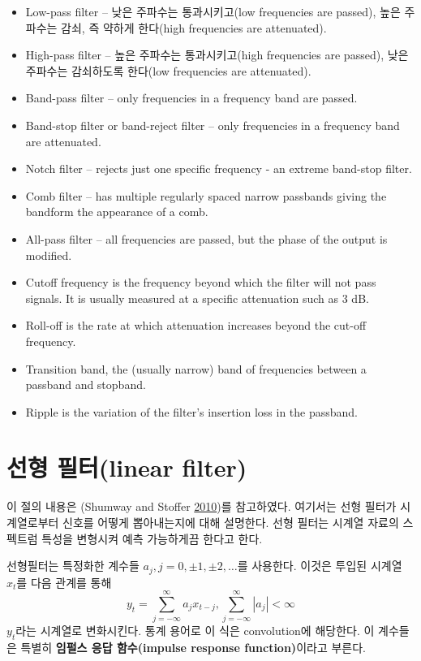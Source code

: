 \documentclass[b5paper,]{book}
\theoremstyle{definition}
\theoremstyle{definition}
\theoremstyle{definition}
\theoremstyle{remark}
\begin{document}
\begin{itemize}
\item
  Low-pass filter -- 낮은 주파수는 통과시키고(low frequencies are
  passed), 높은 주파수는 감쇠, 즉 약하게 한다(high frequencies are
  attenuated).
\item
  High-pass filter -- 높은 주파수는 통과시키고(high frequencies are
  passed), 낮은 주파수는 감쇠하도록 한다(low frequencies are
  attenuated).
\item
  Band-pass filter -- only frequencies in a frequency band are passed.
\item
  Band-stop filter or band-reject filter -- only frequencies in a
  frequency band are attenuated.
\item
  Notch filter -- rejects just one specific frequency - an extreme
  band-stop filter.
\item
  Comb filter -- has multiple regularly spaced narrow passbands giving
  the bandform the appearance of a comb.
\item
  All-pass filter -- all frequencies are passed, but the phase of the
  output is modified.
\item
  Cutoff frequency is the frequency beyond which the filter will not
  pass signals. It is usually measured at a specific attenuation such as
  3 dB.
\item
  Roll-off is the rate at which attenuation increases beyond the cut-off
  frequency.
\item
  Transition band, the (usually narrow) band of frequencies between a
  passband and stopband.
\item
  Ripple is the variation of the filter's insertion loss in the
  passband.
\end{itemize}

\section{선형 필터(linear filter)}\label{-linear-filter}

이 절의 내용은 (Shumway and Stoffer
\protect\hyperlink{ref-Shumway2010}{2010})를 참고하였다. 여기서는 선형
필터가 시계열로부터 신호를 어떻게 뽑아내는지에 대해 설명한다. 선형
필터는 시계열 자료의 스펙트럼 특성을 변형시켜 예측 가능하게끔 한다고
한다.

선형필터는 특정화한 계수들 \(a_{j}, j=0,\pm 1, \pm 2, \ldots\)를
사용한다. 이것은 투입된 시계열 \(x_{t}\)를 다음 관계를 통해
\[y_{t}=\sum_{j=-\infty}^{\infty}a_{j}x_{t-j}, \sum_{j=-\infty}^{\infty}|a_{j}| <\infty\]
\(y_{t}\)라는 시계열로 변화시킨다. 통계 용어로 이 식은 convolution에
해당한다. 이 계수들은 특별히 \textbf{임펄스 응답 함수(impulse response
function)}이라고 부른다.
\end{document}
